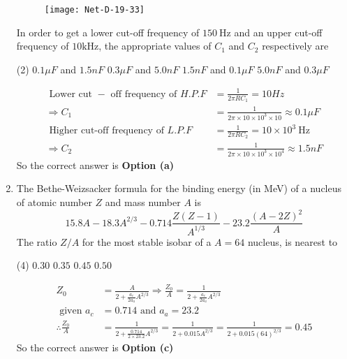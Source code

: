 \begin{enumerate}
\begin{figure}[H]
	\centering
	\texttt{[image: Net-D-19-33]}
\end{figure}	
In order to get a lower cut-off frequency of $150 \mathrm{~Hz}$ and an upper cut-off frequency of $10 \mathrm{kHz}$, the appropriate values of $C_{1}$ and $C_{2}$ respectively are
 \begin{tasks}(2)
	\task[\textbf{a.}]$0.1 \mu F$ and $1.5 n F$
	\task[\textbf{b.}]$0.3 \mu F$ and $5.0 n F$
	\task[\textbf{c.}] $1.5 n F$ and $0.1 \mu F$
	\task[\textbf{d.}]  $5.0 n F$ and $0.3 \mu F$
\end{tasks}
\begin{answer}
	\begin{align*}
	\text { Lower cut }-\text { off frequency of } H . P . F&=\frac{1}{2 \pi R C_{1}}=10 H z\\
	\Rightarrow C_{1}&=\frac{1}{2 \pi \times 10 \times 10^{3} \times 10} \approx 0.1 \mu F\\
	\text { Higher cut-off frequency of } L . P . F&=\frac{1}{2 \pi R C_{2}}=10 \times 10^{3} \mathrm{~Hz}\\
	\Rightarrow C_{2}&=\frac{1}{2 \pi \times 10 \times 10^{3} \times 10^{4}} \approx 1.5 n F
	\end{align*}
	So the correct answer is \textbf{Option (a)}
\end{answer}
\item The Bethe-Weizsacker formula for the binding energy (in MeV) of a nucleus of atomic number $Z$ and mass number $A$ is
$$
15.8 A-18.3 A^{2 / 3}-0.714 \frac{Z(Z-1)}{A^{1 / 3}}-23.2 \frac{(A-2 Z)^{2}}{A}
$$
The ratio $Z / A$ for the most stable isobar of a $A=64$ nucleus, is nearest to
 \begin{tasks}(4)
	\task[\textbf{a.}]$0.30$
	\task[\textbf{b.}]$0.35$
	\task[\textbf{c.}]$0.45$
	\task[\textbf{d.}] $0.50$
\end{tasks}
\begin{answer}
	\begin{align*}
	Z_{0}&=\frac{A}{2+\frac{a_{c}}{2 a_{a}} A^{2 / 3}} \Rightarrow \frac{Z_{0}}{A}=\frac{1}{2+\frac{a_{c}}{2 a_{a}} A^{2 / 3}}\\
	\text { given } a_{c}&=0.714 \text { and } a_{a}=23.2\\
	\therefore \frac{Z_{0}}{A}&=\frac{1}{2+\frac{0.714}{2 \times 23.2} A^{2 / 3}}=\frac{1}{2+0.015 A^{2 / 3}}=\frac{1}{2+0.015(64)^{2 / 3}}=0.45
	\end{align*}
	So the correct answer is \textbf{Option (c)}
\end{answer}

\end{enumerate}
